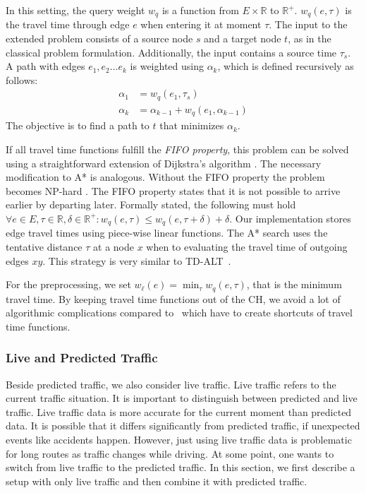 \documentclass[manuscript,review]{acmart}
\begin{document}
In this setting, the query weight $w_q$ is a function from $E\times \mathbb{R}$ to $\mathbb{R}^+$.
$w_q(e, \tau)$ is the travel time through edge $e$ when entering it at moment $\tau$.
The input to the extended problem consists of a source node $s$ and a target node $t$, as in the classical problem formulation.
Additionally, the input contains a source time $\tau_s$.
A path with edges $e_1,e_2\ldots e_k$ is weighted using $\alpha_k$, which is defined recursively as follows:\[
\begin{split}
\alpha_{1} & = w_q(e_1, \tau_s) \\
\alpha_{k} & = \alpha_{k-1} + w_q(e_1, \alpha_{k-1})
\end{split}
\]
The objective is to find a path to $t$ that minimizes $\alpha_k$.

If all travel time functions fulfill the \emph{FIFO property}, this problem can be solved using a straightforward extension of Dijkstra's algorithm \cite{d-aassp-69}.
The necessary modification to A* is analogous.
Without the FIFO property the problem becomes NP-hard \cite{or-tnp-89}.
The FIFO property states that it is not possible to arrive earlier by departing later.
Formally stated, the following must hold $\forall e\in E,\tau\in \mathbb{R},\delta\in \mathbb{R}^+: w_q(e, \tau) \le w_q(e, \tau+\delta) + \delta$.
Our implementation stores edge travel times using piece-wise linear functions.
The A* search uses the tentative distance $\tau$ at a node $x$ when to evaluating the travel time of outgoing edges $x y$.
This strategy is very similar to TD-ALT~\cite{ndls-bastd-12,dw-lbrdg-07}.

For the preprocessing, we set $w_\ell(e) = \min_\tau w_q(e,\tau)$, that is the minimum travel time.
By keeping travel time functions out of the CH, we avoid a lot of algorithmic complications compared to~\cite{bgsv-mtdtt-13,bdpw-dtdrp-16,swz-sfert-20,dn-crdtd-12} which have to create shortcuts of travel time functions.

\subsubsection{Live and Predicted Traffic}
\label{sec:live-predicted-traffic}

Beside predicted traffic, we also consider live traffic.
Live traffic refers to the current traffic situation.
It is important to distinguish between predicted and live traffic.
Live traffic data is more accurate for the current moment than predicted data.
It is possible that it differs significantly from predicted traffic, if unexpected events like accidents happen.
However, just using live traffic data is problematic for long routes as traffic changes while driving.
At some point, one wants to switch from live traffic to the predicted traffic.
In this section, we first describe a setup with only live traffic and then combine it with predicted traffic.
\end{document}
